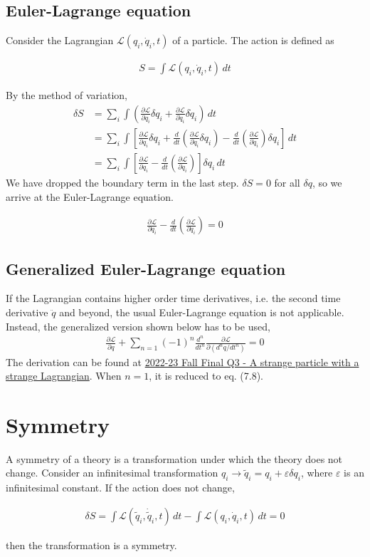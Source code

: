 \documentclass[12pt]{book} %
\numberwithin{equation}{chapter}
\def\d{\delta}
\def\e{\varepsilon}
\def\La{\mathcal{L}}
\def\p{\partial}
\begin{document}
\subsection*{Euler-Lagrange equation}
Consider the Lagrangian $\La (q_{i}, \dot{q}_{i}, t)$ of a particle. The action is defined as
\begin{eqnbox}
\begin{align}
S=\int \La(q_{i}, \dot{q}_{i}, t)\,dt
\end{align}
\end{eqnbox}
By the method of variation, 
\begin{align*}
\d S&=\sum_{i}\int\left(\frac{\p \La}{\p q_{i}}\d q_{i}+\frac{\p \La}{\p \dot{q}_{i}}\d\dot{q}_{i}\right)\,dt\\
&=\sum_{i}\int\left[\frac{\p \La}{\p q_{i}}\d q_{i}+\frac{d}{dt}\left(\frac{\p \La}{\p \dot{q}_{i}}\d q_{i}\right)-\frac{d}{dt}\left(\frac{\p \La}{\p \dot{q}_{i}}\right)\d q_{i}\right]\,dt\\
&=\sum_{i}\int\left[\frac{\p \La}{\p q_{i}}-\frac{d}{dt}\left(\frac{\p \La}{\p \dot{q}_{i}}\right)\right]\d q_{i}\,dt
\end{align*}
We have dropped the boundary term in the last step. $\d S=0$ for all $\d q$, so we arrive at the Euler-Lagrange equation.
\begin{eqnbox}
\begin{align}
\frac{\p \La}{\p q_{i}}-\frac{d}{dt}\left(\frac{\p \La}{\p \dot{q}_{i}}\right)=0
\end{align}
\end{eqnbox}

\subsection*{Generalized Euler-Lagrange equation}
If the Lagrangian contains higher order time derivatives, i.e. the second time derivative $\ddot{q}$ and beyond, the usual Euler-Lagrange equation is not applicable. Instead, the generalized version shown below has to be used,
\begin{align*}
\frac{\p \La}{\p q}+\sum_{n=1}(-1)^{n}\frac{d^{n}}{dt^{n}}\frac{\p \La}{\p (d^{n}q/dt^{n})}=0
\end{align*}
The derivation can be found at \hyperref[A strange particle with a strange Lagrangian]{2022-23 Fall Final Q3 - A strange particle with a strange Lagrangian}. When $n=1$, it is reduced to eq. (7.8).

\section{Symmetry}
A symmetry of a theory is a transformation under which the theory does not change. Consider an infinitesimal transformation $q_{i}\to \tilde{q}_{i}=q_{i}+\e\d q_{i}$, where $\e$ is an infinitesimal constant. If the action does not change, 
\begin{eqnbox}
\begin{align}
\d S=\int \La(\tilde{q}_{i}, \dot{\tilde{q}}_{i}, t)\,dt-\int \La(q_{i}, \dot{q}_{i}, t)\,dt=0
\end{align}
\end{eqnbox}
then the transformation is a symmetry.
\end{document}
